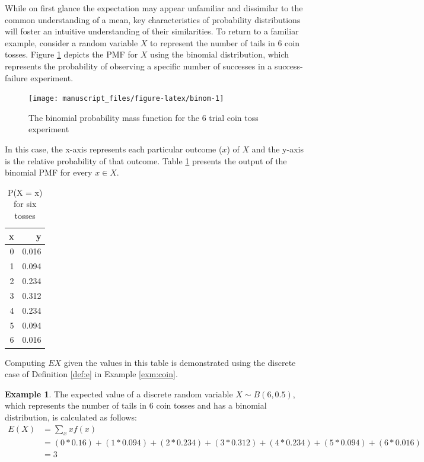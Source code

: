 \documentclass[
  12pt,
]{book}
\theoremstyle{definition}
\theoremstyle{definition}
\newtheorem{example}{Example}[chapter]
\theoremstyle{definition}
\theoremstyle{remark}
\begin{document}
While on first glance the expectation may appear unfamiliar and dissimilar to the common understanding of a mean, key characteristics of probability distributions will foster an intuitive understanding of their similarities.
To return to a familiar example, consider a random variable \(X\) to represent the number of tails in 6 coin tosses. Figure \ref{fig:binom} depicts the PMF for \(X\) using the binomial distribution, which represents the probability of observing a specific number of successes in a success-failure experiment.

\begin{figure}

{\centering \texttt{[image: manuscript\_files/figure-latex/binom-1]} 

}

\caption{The binomial probability mass function for the 6 trial coin toss experiment}\label{fig:binom}
\end{figure}

In this case, the x-axis represents each particular outcome (\(x\)) of \(X\) and the y-axis is the relative probability of that outcome. Table \ref{tab:bino} presents the output of the binomial PMF for every \(x \in X\).

\begin{table}[!h]

\caption{\label{tab:bino}P(X = x) for six tosses}
\centering
\begin{tabular}[t]{rr}
\toprule
x & y\\
\midrule
0 & 0.016\\
1 & 0.094\\
2 & 0.234\\
3 & 0.312\\
4 & 0.234\\
5 & 0.094\\
6 & 0.016\\
\bottomrule
\end{tabular}
\end{table}

Computing \(EX\) given the values in this table is demonstrated using the discrete case of Definition \ref{def:e} in Example \ref{exm:coin}.

\begin{example}
\protect\hypertarget{exm:coin}{}{\label{exm:coin} }The expected value of a discrete random variable \(X \sim B(6, 0.5)\), which represents the number of tails in 6 coin tosses and has a binomial distribution, is calculated as follows:
\[\begin{split}
E(X) & = \sum_{x}xf(x) \\
  & =  (0*0.16)+(1*0.094)+(2*0.234)+(3*0.312)+(4*0.234)+(5*0.094)+(6*0.016)\\
  & = 3
\end{split}\]
\end{example}
\end{document}

